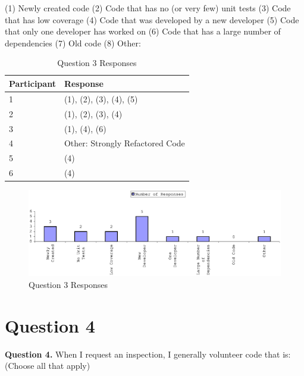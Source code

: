 (1) Newly created code \newline
\indent (2) Code that has no (or very few) unit tests \newline
\indent (3) Code that has low coverage \newline
\indent (4) Code that was developed by a new developer \newline
\indent (5) Code that only one developer has worked on \newline
\indent (6) Code that has a large number of dependencies \newline
\indent (7) Old code \newline
\indent (8) Other:  \newline

\begin{table}[!h]
  \begin{center}
    \caption{Question 3 Responses}
    \label{tab:pre-selection-questionnaire-results-3}
    \begin{tabular}{|p{3.0cm}|p{10.0cm}|} \hline
{\bf Participant} & {\bf Response} \\ \hline
1 & (1), (2), (3), (4), (5) \\ \hline
2 & (1), (2), (3), (4) \\ \hline
3 & (1), (4), (6) \\ \hline
4 & Other: Strongly Refactored Code \\ \hline
5 & (4) \\ \hline
6 & (4) \\ \hline
    \end{tabular}
  \end{center}
\end{table}

\begin{figure}[htb]
  \centering
  \includegraphics[width=1.0\textwidth]{figs/Results/pre-selection-questionnaire-3.eps}
  \caption{Question 3 Responses}
  \label{fig:pre-selection-questionnaire-results-3}
\end{figure}


\clearpage
\section{Question 4}
\label{appendix:section:question4}
\noindent \textbf{Question 4.} When I request an inspection, I generally
volunteer code that is: (Choose all that apply)

